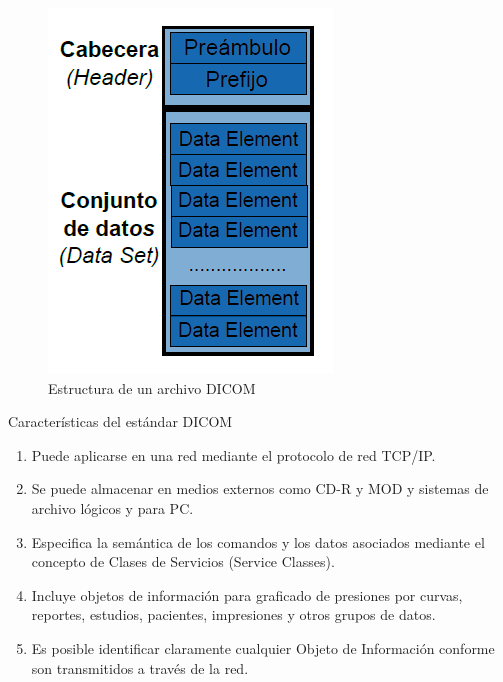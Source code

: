 \documentclass[12pt]{report}
\begin{document}
\begin{figure}[H]
\centering
\includegraphics[width = 7 cm, height = 10 cm]{estructura}
\caption{Estructura de un archivo DICOM}
\end{figure}

Características del estándar DICOM
\begin{enumerate}
\item Puede aplicarse en una red mediante el protocolo de red TCP/IP.
\item Se puede almacenar en medios externos como CD-R y MOD y sistemas de archivo lógicos y
para PC.
\item Especifica la semántica de los comandos y los datos asociados mediante el concepto de Clases
de Servicios (Service Classes).
\item Incluye objetos de información para graficado de presiones por curvas, reportes, estudios,
pacientes, impresiones y otros grupos de datos.
\item Es posible identificar claramente cualquier Objeto de Información conforme son transmitidos
a través de la red.
\end{enumerate}
\end{document}
